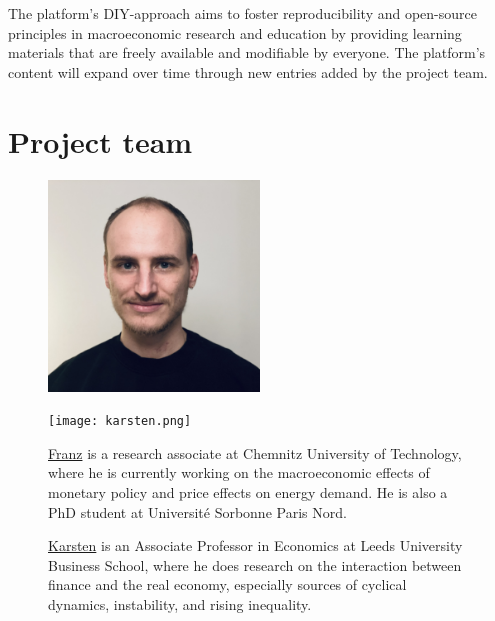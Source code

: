 \documentclass[
  letterpaper,
  DIV=11,
  numbers=noendperiod]{scrreprt}
\begin{document}
The platform's DIY-approach aims to foster reproducibility and
open-source principles in macroeconomic research and education by
providing learning materials that are freely available and modifiable by
everyone. The platform's content will expand over time through new
entries added by the project team.

\section*{Project team}\label{project-team}


\begin{figure}

\begin{minipage}{0.50\linewidth}

\includegraphics[width=0.5\textwidth,height=\textheight]{franz.jpeg}

\end{minipage}%
%
\begin{minipage}{0.50\linewidth}

\texttt{[image: karsten.png]}

\end{minipage}%

\end{figure}%

\begin{figure}

\begin{minipage}{0.50\linewidth}
\href{https://fprante.me/}{Franz} is a research associate at Chemnitz
University of Technology, where he is currently working on the
macroeconomic effects of monetary policy and price effects on energy
demand. He is also a PhD student at Université Sorbonne Paris
Nord.\end{minipage}%
%
\begin{minipage}{0.50\linewidth}
\href{https://karstenkohler.com/}{Karsten} is an Associate Professor in
Economics at Leeds University Business School, where he does research on
the interaction between finance and the real economy, especially sources
of cyclical dynamics, instability, and rising inequality.\end{minipage}%

\end{figure}%
\end{document}
